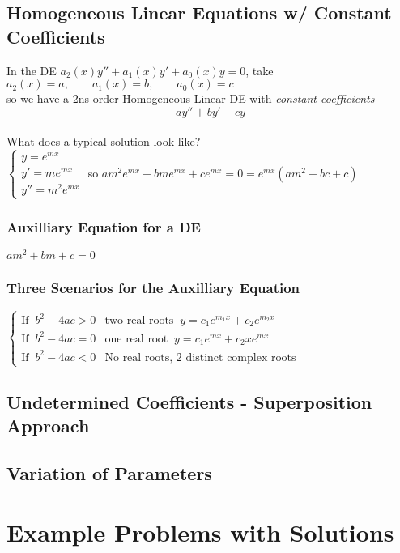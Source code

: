 \documentclass{article}
\begin{document}
\subsection{Homogeneous Linear Equations w/ Constant Coefficients}
In the DE $a_2(x)y''+a_1(x)y'+a_0(x)y=0$, take \\
$a_2(x)=a,\qquad a_1(x)=b,\qquad a_0(x)=c$
\\ so we have a 2ns-order Homogeneous Linear DE with \textit{constant coefficients}
$$ay''+by'+cy$$
\\What does a typical solution look like?
\\$\begin{cases}
    y=e^{mx}
    \\y'=me^{mx}
    \\y''=m^2e^{mx}
\end{cases}$ so $am^2e^{mx}+bme^{mx}+ce^{mx}=0=e^{mx}(am^2+bc+c)$
\subsubsection*{Auxilliary Equation for a DE} $am^2+bm+c=0$
\subsubsection*{Three Scenarios for the Auxilliary Equation}
$\begin{cases}
    \text{If}\;\; b^2-4ac>0 & \text{two real roots}\;\; y=c_1e^{m_1x}+c_2e^{m_2x}
    \\ \text{If}\;\; b^2-4ac=0 & \text{one real root}\;\; y=c_1e^{mx}+c_2xe^{mx}
    \\\text{If}\;\; b^2-4ac<0 & \text{No real roots, 2 distinct complex roots}
\end{cases}$
\subsection{Undetermined Coefficients - Superposition Approach}
\subsection{Variation of Parameters}









\pagebreak
\section{Example Problems with Solutions}
\end{document}
